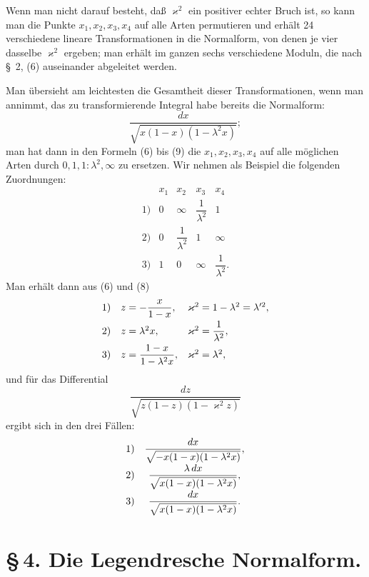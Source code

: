 \documentclass[11pt]{article}
\begin{document}
Wenn man nicht darauf besteht, daß $\varkappa^2$ ein positiver echter Bruch ist, so kann man die Punkte $x_1,x_2,x_3,x_4$ auf alle Arten permutieren und erhält 24 verschiedene lineare Transformationen in die Normalform, von denen je vier dasselbe $\varkappa^2$ ergeben; man erhält im ganzen sechs verschiedene Moduln, die nach \S~2, (6) auseinander abgeleitet werden.

Man übersieht am leichtesten die Gesamtheit dieser Transformationen, wenn man annimmt, das zu transformierende Integral habe bereits die Normalform:
\[
\frac{dx}{\sqrt{x(1-x)(1-\lambda^2x)}};
\]
man hat dann in den Formeln (6) bis (9) die $x_1,x_2,x_3,x_4$ auf alle möglichen Arten durch $0,1,1:\lambda^2,\infty$ zu ersetzen. Wir nehmen als Beispiel die folgenden Zuordnungen:
\[
\begin{array}{c|cccc}
&x_1&x_2&x_3&x_4\\ \hline
1)&0&\infty&\dfrac{1}{\lambda^2}&1\\[0.5em]
2)&0&\dfrac{1}{\lambda^2}&1&\infty\\[0.5em]
3)&1&0&\infty&\dfrac{1}{\lambda^2}.
\end{array}
\]
Man erhält dann aus (6) und (8)
\[
\begin{array}{r@{\quad}l@{\quad}l}
1)& z=-\dfrac{x}{1-x},& \varkappa^2=1-\lambda^2=\lambda'^2,\\[0.7em]
2)& z=\lambda^2x,& \varkappa^2=\dfrac1{\lambda^2},\\[0.7em]
3)& z=\dfrac{1-x}{1-\lambda^2x},& \varkappa^2=\lambda^2,
\end{array}
\]
und für das Differential
\[
\frac{dz}{\sqrt{z(1-z)(1-\varkappa^2z)}}
\]
ergibt sich in den drei Fällen:
\[
\begin{array}{r@{\quad}c}
1)& \dfrac{dx}{\sqrt{-x(1-x)(1-\lambda^2x)}},\\[0.9em]
2)& \dfrac{\lambda\,dx}{\sqrt{x(1-x)(1-\lambda^2x)}},\\[0.9em]
3)& \dfrac{dx}{\sqrt{x(1-x)(1-\lambda^2x)}}.
\end{array}
\]

\section*{\S\,4. Die Legendresche Normalform.}
\end{document}
